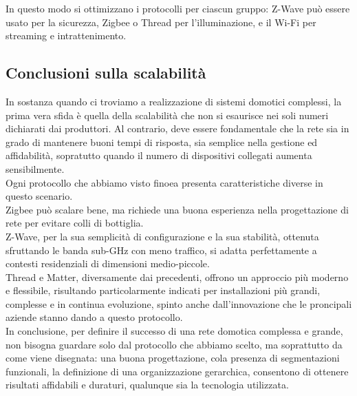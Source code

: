 In questo modo si ottimizzano i protocolli per ciascun gruppo: Z-Wave può essere usato per la sicurezza, Zigbee o Thread per l’illuminazione, e il Wi-Fi per streaming e intrattenimento.

\subsection{Conclusioni sulla scalabilità}

In sostanza quando ci troviamo a realizzazione di sistemi domotici complessi, la prima vera sfida è quella della scalabilità che non si esaurisce nei soli numeri dichiarati dai produttori. Al contrario, deve essere fondamentale che la rete sia in grado di mantenere buoni tempi di risposta, sia semplice nella gestione ed affidabilità, sopratutto  quando il numero di dispositivi collegati aumenta sensibilmente.\\

Ogni protocollo che abbiamo visto finoea presenta caratteristiche diverse in questo scenario.\\
Zigbee può scalare bene, ma richiede una buona esperienza nella progettazione di rete per evitare colli di bottiglia.\\
Z-Wave, per la sua semplicità di configurazione e la sua stabilità, ottenuta sfruttando le banda sub-GHz con meno traffico, si adatta perfettamente a contesti residenziali di dimensioni medio-piccole.\\
Thread e Matter, diversamente dai precedenti, offrono un approccio più moderno e flessibile, risultando particolarmente indicati per installazioni più grandi, complesse e in continua evoluzione, spinto anche dall'innovazione che le proncipali aziende stanno dando a questo protocollo.\\

In conclusione, per definire il successo di una rete domotica complessa e grande, non bisogna guardare solo dal protocollo che abbiamo scelto, ma soprattutto da come viene disegnata: una buona progettazione, cola presenza di segmentazioni funzionali, la definizione di una organizzazione gerarchica, consentono di ottenere risultati affidabili e duraturi, qualunque sia la tecnologia utilizzata.
